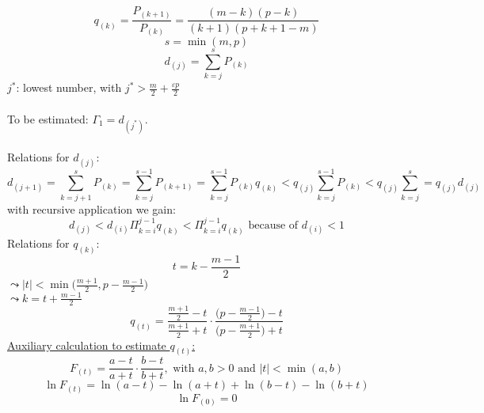 \begin{equation}
	q_{(k)} = \frac{P_{(k+1)}}{P_{(k)}} 
		= \frac{ (m-k)(p-k) }{ (k+1)(p+k+1-m) }
\end{equation}
\begin{equation}
	s = \min(m, p)
\end{equation}
\begin{equation}
	d_{(j)} = \sum_{k = j}^s P_{(k)}
\end{equation}
$j^*$: lowest number, with $j^* > \frac{m}{2} + \frac{\varepsilon p}{2}$\\\\
To be estimated: $\Gamma_1 = d_{ (j^*) }$.\\\\
Relations for $d_{ (j) }$:
\begin{equation}
	d_{ (j + 1) } = \sum_{ k = j + 1 }^s P_{ (k) }
	= \sum_{ k = j }^{ s - 1 } P_{ (k + 1) }
	= \sum_{ k = j }^{ s - 1 } P_{ (k) } q_{ (k) }
	< q_{ (j) } \sum_{ k = j }^{ s - 1 } P_{ (k) }
	< q_{ (j) } \sum_{ k = j }^{ s }
	= q_{ (j) } d_{ (j) }
\end{equation}
with recursive application we gain:
\begin{equation}	
	d_{ (j) } < d_{ (i) } \Pi_{ k = i }^{j - 1} q_{ (k) }
		< \Pi_{ k = i }^{j - 1} q_{ (k) }
		\textrm{ because of } d_{ (i) } < 1
\end{equation}
Relations for $q_{ (k) }$:
\begin{equation} 
	t = k - \frac{m - 1}{2}
\end{equation}
$\leadsto |t| < \min \Big( \frac{m + 1}{2}, p - \frac{m - 1}{2}	\Big)$\\
$\leadsto k = t + \frac{m - 1}{2}$
\begin{equation}
	q_{ (t) } = \frac{ \frac{m + 1}{2} - t }{ \frac{m + 1}{2} + t } \cdotp 
		\frac{ \Big(p - \frac{m - 1}{2} \Big) - t }
			{ \Big(p - \frac{m + 1}{2} \Big) + t }
\end{equation}
\underline{Auxiliary calculation to estimate $q_{ (t) }$:}
\begin{equation}
	F_{ (t) } = \frac{ a - t }{ a + t } \cdotp \frac{ b - t }{b + t },
	\textrm{ with } a,b > 0 \textrm{ and } |t| < \min(a,b)
\end{equation}
\begin{equation}
	\ln F_{ (t) } = \ln (a - t) - \ln (a + t) + \ln (b - t) - \ln (b + t)
\end{equation}
\begin{equation}
	\ln F_{ (0) } = 0
\end{equation}
